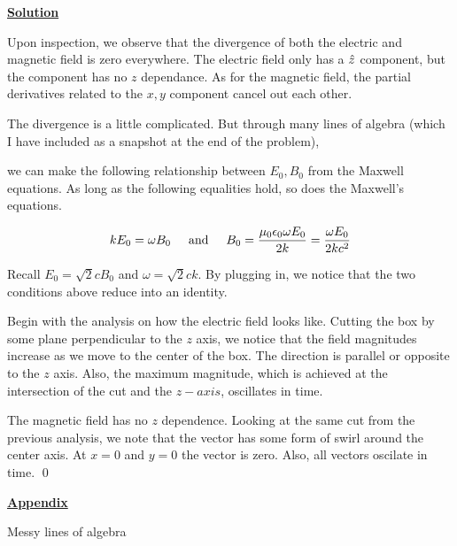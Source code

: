 \documentclass{article}
\newcommand{\new}[1]{
    \vspace{2mm}
    \noindent
    \textbf{
    \underline{#1}}
}
\newcommand{\textAnd}{
    {
        \hspace{5mm}
        \textrm{and}
        \hspace{5mm}
    }
}
\begin{document}
\new{Solution}

Upon inspection, we observe that 
the divergence of both the electric 
and magnetic field is zero everywhere. 
The electric field only has a $\hat{z}$ component, 
but the component has no $z$ dependance. 
As for the magnetic field, the partial derivatives 
related to the $x, y$ component cancel out 
each other. 

The divergence is a little complicated. 
But through many lines of algebra
(which I have included as a snapshot 
at the end of the problem),

we can make the following relationship 
between $E_0, B_0$ from the Maxwell equations. 
As long as the following equalities hold, 
so does the Maxwell's equations. 

\[
    kE_0 = \omega B_0 
    \textAnd 
    B_0 = \frac{
        \mu_0 \epsilon_0 \omega E_0
    }
    {2k}
    = \frac{\omega E_0}{2kc^2}
\]

Recall $E_0 = \sqrt{2}cB_0$ and $\omega = \sqrt{2}ck$. 
By plugging in, we notice that 
the two conditions above reduce into an identity. 

Begin with the analysis on how the 
electric field looks like. Cutting 
the box by some plane perpendicular 
to the $z$ axis, we notice that 
the field magnitudes increase as 
we move to the center of the box. 
The direction is parallel or opposite 
to the $z$ axis. Also, the maximum 
magnitude, which is achieved at the 
intersection of the cut and the $z-axis$, 
oscillates in time. 

The magnetic field has no $z$ dependence. 
Looking at the same cut from the previous analysis, 
we note that the vector has some form 
of swirl around the center axis. At $x = 0$
and $y = 0$ 
the vector is zero. Also, all vectors 
oscilate in time.  
\qed 
\newpage
\new{Appendix} 
Messy lines of algebra
\end{document}
